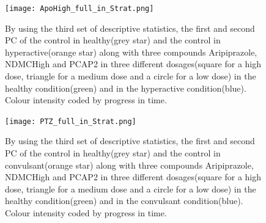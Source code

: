 \documentclass[a4paper,12pt]{article}
\begin{document}
\begin{figure}[h!]
\begin{center}
\texttt{[image: ApoHigh\_full\_in\_Strat.png]}
\caption{By using the third set of descriptive statistics, the first and second PC of the control in healthy(grey star) and the control in hyperactive(orange star) along with three compounds Aripiprazole, NDMCHigh and PCAP2 in three different dosages(square for a high dose, triangle for a medium dose and a circle for a low dose) in the healthy condition(green) and in the hyperactive condition(blue). Colour intensity coded by progress in time.}
\end{center}
\end{figure}

\begin{figure}[h!]
\begin{center}
\texttt{[image: PTZ\_full\_in\_Strat.png]}
\caption{By using the third set of descriptive statistics, the first and second PC of the control in healthy(grey star) and the control in convulsant(orange star) along with three compounds Aripiprazole, NDMCHigh and PCAP2 in three different dosages(square for a high dose, triangle for a medium dose and a circle for a low dose) in the healthy condition(green) and in the convulsant condition(blue). Colour intensity coded by progress in time.}
\end{center}
\end{figure}
\newpage
\end{document}
